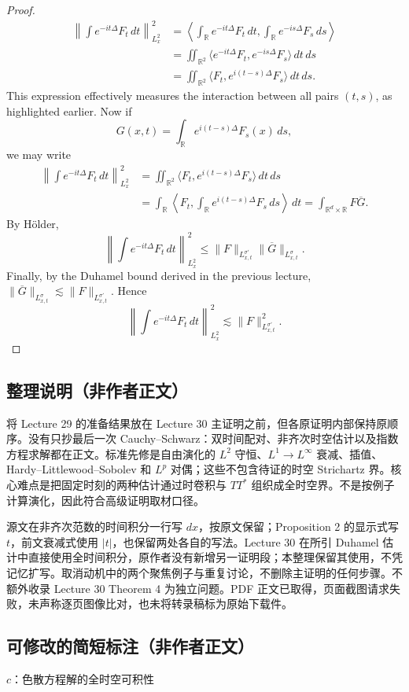 \documentclass[UTF8,11pt]{ctexart}
\theoremstyle{definition}
\newcommand{\R}{\mathbb R}
\begin{document}
\begin{proof}
\begin{align*}
\left\|\int e^{-it\Delta}F_t\,dt\right\|_{L^2_x}^2
&=\left\langle\int_\R e^{-it\Delta}F_t\,dt,\int_\R e^{-is\Delta}F_s\,ds\right\rangle\\
&=\iint_{\R^2}\langle e^{-it\Delta}F_t,e^{-is\Delta}F_s\rangle\,dt\,ds\\
&=\iint_{\R^2}\langle F_t,e^{i(t-s)\Delta}F_s\rangle\,dt\,ds.
\end{align*}
This expression effectively measures the interaction between all pairs $(t,s)$, as highlighted earlier. Now if
\[G(x,t)=\int_\R e^{i(t-s)\Delta}F_s(x)\,ds,\]
we may write
\begin{align*}
\left\|\int e^{-it\Delta}F_t\,dt\right\|_{L^2_x}^2
&=\iint_{\R^2}\langle F_t,e^{i(t-s)\Delta}F_s\rangle\,dt\,ds\\
&=\int_\R\left\langle F_t,\int_\R e^{i(t-s)\Delta}F_s\,ds\right\rangle\,dt
=\int_{\R^d\times\R}F\overline G.
\end{align*}
By H\"older,
\[\left\|\int e^{-it\Delta}F_t\,dt\right\|_{L^2_x}^2\leq\|F\|_{L^{\sigma'}_{x,t}}\|\overline G\|_{L^\sigma_{x,t}}.\]
Finally, by the Duhamel bound derived in the previous lecture, $\|\overline G\|_{L^\sigma_{x,t}}\lesssim\|F\|_{L^{\sigma'}_{x,t}}$. Hence
\[\left\|\int e^{-it\Delta}F_t\,dt\right\|_{L^2_x}^2\lesssim\|F\|_{L^{\sigma'}_{x,t}}^2.\]
\end{proof}
\subsection*{整理说明（非作者正文）}
将 Lecture 29 的准备结果放在 Lecture 30 主证明之前，但各原证明内部保持原顺序。没有只抄最后一次 Cauchy--Schwarz：双时间配对、非齐次时空估计以及指数方程求解都在正文。标准先修是自由演化的 $L^2$ 守恒、$L^1\to L^\infty$ 衰减、插值、Hardy--Littlewood--Sobolev 和 $L^p$ 对偶；这些不包含待证的时空 Strichartz 界。核心难点是把固定时刻的两种估计通过时卷积与 $TT^*$ 组织成全时空界。不是按例子计算演化，因此符合高级证明取材口径。

源文在非齐次范数的时间积分一行写 $dx$，按原文保留；Proposition 2 的显示式写 $t$，前文衰减式使用 $|t|$，也保留两处各自的写法。Lecture 30 在所引 Duhamel 估计中直接使用全时间积分，原作者没有新增另一证明段；本整理保留其使用，不凭记忆扩写。取消动机中的两个聚焦例子与重复讨论，不删除主证明的任何步骤。不额外收录 Lecture 30 Theorem 4 为独立问题。PDF 正文已取得，页面截图请求失败，未声称逐页图像比对，也未将转录稿标为原始下载件。
\subsection*{可修改的简短标注（非作者正文）}
$c$：色散方程解的全时空可积性
\end{document}
